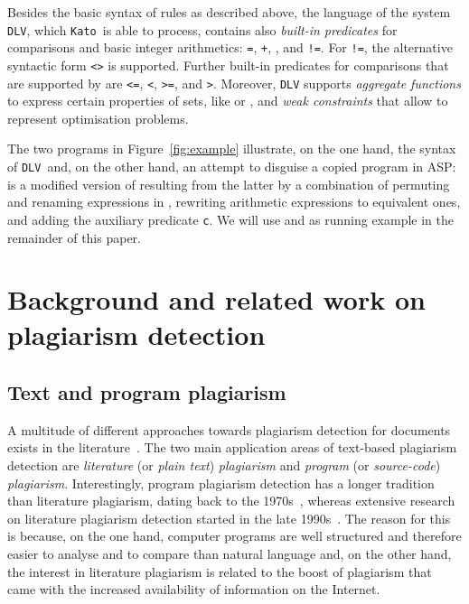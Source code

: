 \documentclass{tlp}
\newcommand{\dlv}{\texttt{DLV}\xspace}
\newcommand{\kato}[0]{\texttt{Kato}\xspace}
\begin{document}
Besides the basic syntax of rules as described above, the language of the system \dlv, which \kato\ is able to process,   
contains also \emph{built-in  predicates} for comparisons and basic integer arithmetics:
 {\tt =}, {\tt +}, {\tt *}, and 
{\tt !=}. For  {\tt !=}, the alternative syntactic form {\tt <>} is supported. 
Further built-in predicates for comparisons that are supported by  are
{\tt <=}, {\tt <}, {\tt >=}, and {\tt >}.
Moreover, \dlv supports \emph{aggregate functions} to express certain properties of sets, like   or , and \emph{weak constraints} 
that allow to represent optimisation problems.

The two programs in Figure~\ref{fig:example} illustrate, on the one hand, the syntax of \dlv\ and, on the other hand, an attempt to disguise a copied program in ASP:  is a modified version of  resulting from the latter by a combination of permuting and renaming expressions in
, rewriting  arithmetic expressions to equivalent ones,  and  adding the  auxiliary predicate {\tt c}.
We will use  and  as running example in the remainder of this paper.

\section{Background and related work on plagiarism detection}\label{sec:background}


\subsection{Text and program plagiarism}
A multitude of different approaches towards plagiarism detection for documents
exists in the literature~\cite{maurer2006plagiarism}. 
The  two main application areas of text-based plagiarism detection are
\emph{literature} (or \emph{plain text}) \emph{plagiarism} and \emph{program} (or \emph{source-code}) \emph{plagiarism}.
Interestingly, program plagiarism detection has a  longer tradition than literature plagiarism,
dating back to the 1970s~\cite{ottenstein76},
whereas extensive research on literature plagiarism detection started in the late 1990s~\cite{austinbrown99,Farringdon96analysingfor}.
The reason for this is because, on the one hand,  computer programs are well structured
and therefore easier to analyse and to compare than natural language
and, on the other hand, the  interest in literature plagiarism
is related to the boost of plagiarism that came with
the increased availability of information on the Internet.
\end{document}
